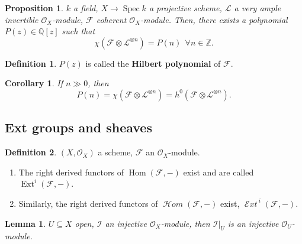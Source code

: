 \documentclass[12pt]{article}
\DeclareMathOperator{\Hom}{Hom}
\DeclareMathOperator{\Spec}{Spec}
\DeclareMathOperator{\shHom}{\mathcal{H}\textit{om}}
\DeclareMathOperator{\Ext}{Ext}
\DeclareMathOperator{\shExt}{\mathcal{E}\textit{xt}\,}
\newtheorem*{proposition}{Proposition}
\newtheorem*{lemma}{Lemma}
\newtheorem*{corollary}{Corollary}
\theoremstyle{definition}
\newtheorem*{definition}{Definition}
\theoremstyle{remark}
\newtheorem*{comment}{Comment}
\begin{document}
\begin{comment}
Hodge theory gives the relation between the arithmetic genus -- that we just defined -- and the topological genus -- the usual one.
\end{comment}

\begin{comment}
There are just finitely many varieties modulo birationality and deformation for each genus. All existing genera are the already known.
\end{comment}

\begin{proposition}
$k$ a field, $X\rightarrow\Spec k$ a projective scheme, $\mathcal{L}$ a very ample invertible $\mathcal{O}_X$-module, $\mathcal{F}$ coherent $\mathcal{O}_X$-module. Then, there exists a polynomial $P(z)\in\mathbb{Q}[z]$ such that
\[\chi(\mathcal{F}\otimes\mathcal{L}^{\otimes n})=P(n)\ \ \forall n\in\mathbb{Z}.\]
\end{proposition}

\begin{definition}
$P(z)$ is called the \textbf{Hilbert polynomial} of $\mathcal{F}$.
\end{definition}

\begin{corollary}
If $n\gg0$, then
\[P(n)=\chi(\mathcal{F}\otimes\mathcal{L}^{\otimes n})=h^0(\mathcal{F}\otimes\mathcal{L}^{\otimes n}).\]
\end{corollary}

\subsection*{Ext groups and sheaves}
\begin{definition}
$(X,\mathcal{O}_X)$ a scheme, $\mathcal{F}$ an $\mathcal{O}_X$-module.

\begin{enumerate}[label=\arabic*)]
\item The right derived functors of $\Hom(\mathcal{F},-)$ exist and are called $\Ext^i(\mathcal{F},-)$.

\item Similarly, the right derived functors of $\shHom(\mathcal{F},-)$ exist, $\shExt^i(\mathcal{F},-)$.
\end{enumerate}
\end{definition}

\begin{lemma}
$U\subseteq X$ open, $\mathcal{I}$ an injective $\mathcal{O}_X$-module, then $\mathcal{I}|_U$ is an injective $\mathcal{O}_U$-module.
\end{lemma}
\end{document}
